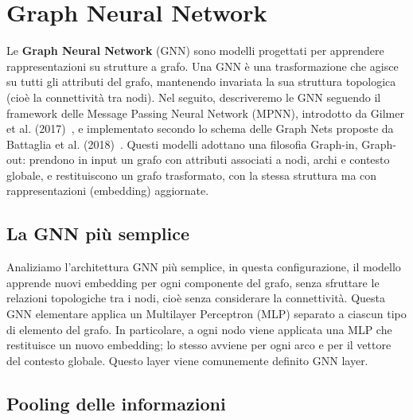 \section{Graph Neural Network}

Le \textbf{Graph Neural Network} (GNN) sono modelli progettati per apprendere rappresentazioni su strutture a grafo. Una GNN è una trasformazione che agisce su tutti gli attributi del grafo, mantenendo invariata la sua struttura topologica (cioè la connettività tra nodi). Nel seguito, descriveremo le GNN seguendo il framework delle Message Passing Neural Network (MPNN), introdotto da Gilmer et al. (2017)~\cite{gilmer2017neural}, e implementato secondo lo schema delle Graph Nets proposte da Battaglia et al. (2018)~\cite{battaglia2018relational}. Questi modelli adottano una filosofia Graph-in, Graph-out: prendono in input un grafo con attributi associati a nodi, archi e contesto globale, e restituiscono un grafo trasformato, con la stessa struttura ma con rappresentazioni (embedding) aggiornate.

\subsection{La GNN più semplice}

Analiziamo l’architettura GNN più semplice, in questa configurazione, il modello apprende nuovi embedding per ogni componente del grafo, senza sfruttare le relazioni topologiche tra i nodi, cioè senza considerare la connettività. Questa GNN elementare applica un Multilayer Perceptron (MLP) separato a ciascun tipo di elemento del grafo. In particolare, a ogni nodo viene applicata una MLP che restituisce un nuovo embedding; lo stesso avviene per ogni arco e per il vettore del contesto globale. Questo layer viene comunemente definito GNN layer.

\subsection{Pooling delle informazioni}

